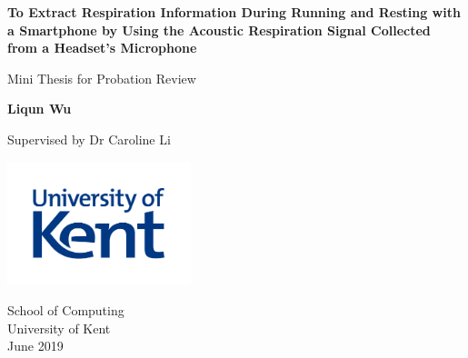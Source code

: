 \documentclass{report}
\begin{document}
\begin{titlepage}
    \begin{center}
 
        \Huge
        \textbf{To Extract Respiration Information During Running and Resting with a Smartphone by Using the Acoustic Respiration Signal Collected from a Headset’s Microphone}
 
        \LARGE
        Mini Thesis for Probation Review
 
        \vspace{0.5cm}

        \textbf{Liqun Wu}

        \Large
        Supervised by Dr Caroline Li
 
        \vfill
 
        \vspace{0.8cm}
 
        \includegraphics[width=0.4\textwidth]{figures/logo.jpg}
 
        \Large
        School of Computing\\
        University of Kent\\
        June 2019
 
    \end{center}
\end{titlepage}

\tableofcontents
\listoffigures







\printbibliography
\end{document}
